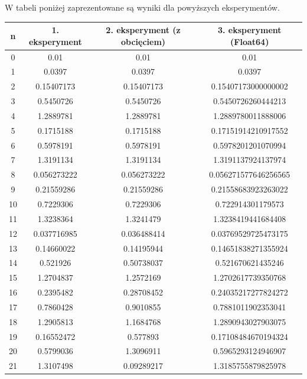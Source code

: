 \documentclass[15pt, a4paper]{article}
\begin{document}
\noindent W tabeli poniżej zaprezentowane są wyniki dla powyższych eksperymentów. 
\vspace{0.5cm}

\begin{longtable}{|c|c|c|c|}
        \hline
        n & 1. eksperyment & 2. eksperyment (z obcięciem) & 3. eksperyment (Float64) \\ \hline
        0 & 0.01 & 0.01 & 0.01 \\ \hline
        1 & 0.0397 & 0.0397 & 0.0397 \\ \hline
        2 & 0.15407173 & 0.15407173 & 0.15407173000000002 \\ \hline
        3 & 0.5450726 & 0.5450726 & 0.5450726260444213 \\ \hline
        4 & 1.2889781 & 1.2889781 & 1.2889780011888006 \\ \hline
        5 & 0.1715188 & 0.1715188 & 0.17151914210917552 \\ \hline
        6 & 0.5978191 & 0.5978191 & 0.5978201201070994 \\ \hline
        7 & 1.3191134 & 1.3191134 & 1.3191137924137974 \\ \hline
        8 & 0.056273222 & 0.056273222 & 0.056271577646256565 \\ \hline
        9 & 0.21559286 & 0.21559286 & 0.21558683923263022 \\ \hline
        10 & 0.7229306 & 0.7229306 & 0.722914301179573 \\ \hline
        11 & 1.3238364 & 1.3241479 & 1.3238419441684408 \\ \hline
        12 & 0.037716985 & 0.036488414 & 0.03769529725473175 \\ \hline
        13 & 0.14660022 & 0.14195944 & 0.14651838271355924 \\ \hline
        14 & 0.521926 & 0.50738037 & 0.521670621435246 \\ \hline
        15 & 1.2704837 & 1.2572169 & 1.2702617739350768 \\ \hline
        16 & 0.2395482 & 0.28708452 & 0.24035217277824272 \\ \hline
        17 & 0.7860428 & 0.9010855 & 0.7881011902353041 \\ \hline
        18 & 1.2905813 & 1.1684768 & 1.2890943027903075 \\ \hline
        19 & 0.16552472 & 0.577893 & 0.17108484670194324 \\ \hline
        20 & 0.5799036 & 1.3096911 & 0.5965293124946907 \\ \hline
        21 & 1.3107498 & 0.09289217 & 1.3185755879825978 \\ \hline

\end{longtable}
\end{document}
